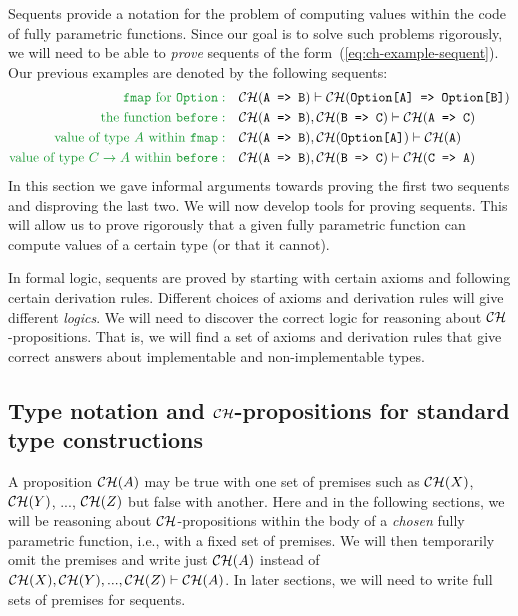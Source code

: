 Sequents provide a notation for the problem of computing values within
the code of fully parametric functions. Since our goal is to solve
such problems rigorously, we will need to be able to \emph{prove}
sequents of the form~(\ref{eq:ch-example-sequent}). Our previous
examples are denoted by the following sequents:
\begin{align*}
{\color{greenunder}\text{\texttt{fmap} for \texttt{Option}}:}\quad & {\cal CH}(\text{\texttt{A => B}})\vdash{\cal CH}(\text{\texttt{Option[A] => Option[B]}})\\
{\color{greenunder}\text{the function \texttt{before}}:}\quad & {\cal CH}(\text{\texttt{A => B}}),{\cal CH}(\text{\texttt{B => C}})\vdash{\cal CH}(\text{\texttt{A => C}})\\
{\color{greenunder}\text{value of type }A\text{ within \texttt{fmap}}:}\quad & {\cal CH}(\text{\texttt{A => B}}),{\cal CH}(\text{\texttt{Option[A]}})\vdash{\cal CH}(\text{\texttt{A}})\\
{\color{greenunder}\text{value of type }C\rightarrow A\text{ within \texttt{before}}:}\quad & {\cal CH}(\text{\texttt{A => B}}),{\cal CH}(\text{\texttt{B => C}})\vdash{\cal CH}(\text{\texttt{C => A}})
\end{align*}
In this section we gave informal arguments towards proving the first
two sequents and disproving the last two. We will now develop tools
for proving sequents. This will allow us to prove rigorously that
a given fully parametric function can compute values of a certain
type (or that it cannot).

In formal logic, sequents are proved by starting
with certain axioms and following certain derivation rules. Different
choices of axioms and derivation rules will give different \emph{logics}.
We will need to discover the correct logic for reasoning about ${\cal CH}$-propositions.
That is, we will find a set of axioms and derivation rules that give
correct answers about implementable and non-implementable types.

\subsection{Type notation and ${\cal CH}$-propositions for standard type constructions\label{subsec:Type-notation-and-standard-type-constructions}}

A proposition ${\cal CH}(A)$ may be true with one set of premises
such as ${\cal CH}(X)$, ${\cal CH}(Y)$, ..., ${\cal CH}(Z)$ but
false with another. Here and in the following sections, we will be
reasoning about ${\cal CH}$-propositions within the body of a \emph{chosen}
fully parametric function, i.e., with a fixed set of premises. We
will then temporarily omit the premises and write just ${\cal CH}(A)$
instead of ${\cal CH}(X),{\cal CH}(Y),...,{\cal CH}(Z)\vdash{\cal CH}(A)$.
In later sections, we will need to write full sets of premises for
sequents.


